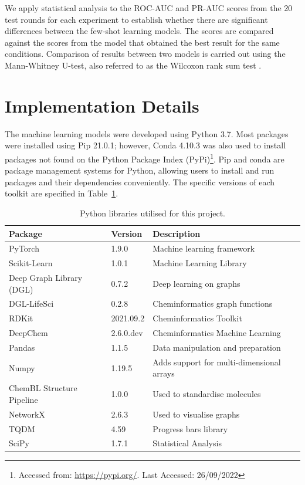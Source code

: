 \documentclass[journal=jcisd8,manuscript=article]{achemso} %
\begin{document}
We apply statistical analysis to the ROC-AUC and PR-AUC scores from the 20 test rounds for each experiment to establish whether there are significant differences between the few-shot learning models. The scores are compared against the scores from the model that obtained the best result for the same conditions. Comparison of results between two models is carried out using the Mann-Whitney U-test, also referred to as the Wilcoxon rank sum test \citep{mann1947test}.

\section{Implementation Details}

The machine learning models were developed using Python 3.7. Most packages were installed using Pip 21.0.1; however, Conda 4.10.3 was also used to install packages not found on the Python Package Index (PyPi)\footnote{Accessed from: \url{https://pypi.org/}. Last Accessed: 26/09/2022}. Pip and conda are package management systems for Python, allowing users to install and run packages and their dependencies conveniently. The specific versions of each toolkit are specified in Table~\ref{tab:versions}.

\begin{table}
    \centering
    \begin{tabular}{@{}lll@{}}
        \hline
        \textbf{Package} & \textbf{Version} & \textbf{Description} \\
        \hline
        PyTorch & 1.9.0 & Machine learning framework \\
        Scikit-Learn & 1.0.1 & Machine Learning Library \\
        Deep Graph Library (DGL) & 0.7.2 & Deep learning on graphs \\
        DGL-LifeSci & 0.2.8 & Cheminformatics graph functions \\
        RDKit & 2021.09.2 & Cheminformatics Toolkit \\
        DeepChem & 2.6.0.dev & Cheminformatics Machine Learning \\
        Pandas & 1.1.5 & Data manipulation and preparation \\
        Numpy & 1.19.5 & Adds support for multi-dimensional arrays \\
        ChemBL Structure Pipeline & 1.0.0 & Used to standardise molecules \\
        NetworkX & 2.6.3 & Used to visualise graphs \\
        TQDM & 4.59 & Progress bars library \\
        SciPy & 1.7.1 & Statistical Analysis \\
        \hline
    \end{tabular}
    \caption{Python libraries utilised for this project.}
    \label{tab:versions}
\end{table}
\end{document}
